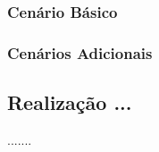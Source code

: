 \documentclass[11pt, a4paper]{article}
\begin{document}
	        \subsubsection{Cenário Básico}
					
	        \subsubsection{Cenários Adicionais}
                
        \subsection{Realização ...}
            .......
\end{document}
